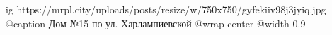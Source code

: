  
 
 
 
 

\ifcmt
  ig https://mrpl.city/uploads/posts/resize/w/750x750/gyfekiiv98j3jyiq.jpg
	@caption Дом №15 по ул. Харлампиевской
  @wrap center
  @width 0.9
\fi
